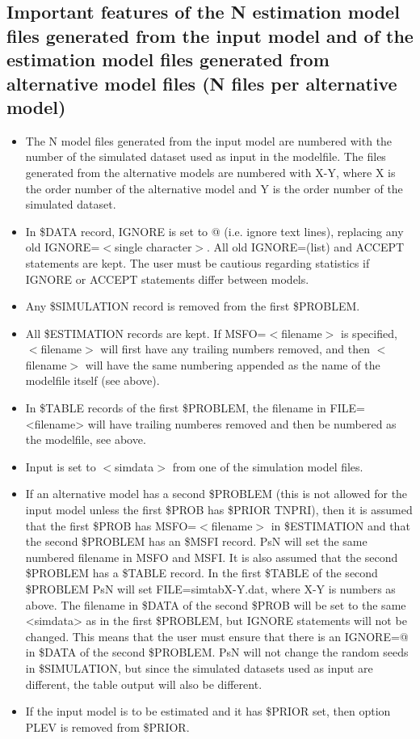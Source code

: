 \subsection{Important features of the N estimation model files generated from the input model and of the estimation model files generated from alternative model files (N files per alternative model)}
\begin{itemize}
	\item The N model files generated from the input model are numbered with the number of the simulated dataset used as input in the modelfile. The files generated from the alternative models are numbered with X-Y, where X is the order number of the alternative model and Y is the order number of the simulated dataset.
	\item In \$DATA record, IGNORE is set to @ (i.e. ignore text lines), replacing any old IGNORE=$<$single character$>$. All old IGNORE=(list) and ACCEPT statements are kept. The user must be cautious regarding statistics if IGNORE or ACCEPT statements differ between models.
	\item Any \$SIMULATION record is removed from the first \$PROBLEM.
	\item All \$ESTIMATION records are kept. If MSFO=$<$filename$>$ is specified, $<$filename$>$ will first have any trailing numbers removed, and then $<$filename$>$ will have the same numbering appended as the name of the modelfile itself (see above).
	\item In \$TABLE records of the first \$PROBLEM, the filename in FILE=<filename> will have trailing numberes removed and then be numbered as the modelfile, see above. 
	\item Input is set to $<$simdata$>$ from one of the simulation model files. 
	\item If an alternative model has a second \$PROBLEM (this is not allowed for the input model unless the first \$PROB has \$PRIOR TNPRI), then it is assumed that the first \$PROB has MSFO=$<$filename$>$ in \$ESTIMATION and that the second \$PROBLEM has an \$MSFI record. PsN will set the same numbered filename in MSFO and MSFI. It is also assumed that the second \$PROBLEM has a \$TABLE record. In the first \$TABLE of the second \$PROBLEM PsN will set FILE=simtabX-Y.dat, where X-Y is numbers as above. The filename in \$DATA of the second \$PROB will be set to the same <simdata> as in the first \$PROBLEM, but IGNORE statements will not be changed. This means that the user must ensure that there is an IGNORE=@ in \$DATA of the second \$PROBLEM. PsN will not change the random seeds in \$SIMULATION, but since the simulated datasets used as input are different, the table output will also be different.
	\item If the input model is to be estimated and it has \$PRIOR set, then option PLEV is removed from \$PRIOR.
\end{itemize}


